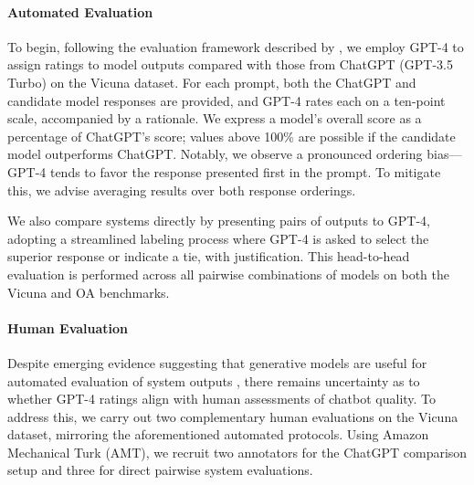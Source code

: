 \paragraph{Automated Evaluation} To begin, following the evaluation framework described by \citet{vicuna2023}, we employ GPT-4 to assign ratings to model outputs compared with those from ChatGPT (GPT-3.5 Turbo) on the Vicuna dataset. For each prompt, both the ChatGPT and candidate model responses are provided, and GPT-4 rates each on a ten-point scale, accompanied by a rationale. We express a model's overall score as a percentage of ChatGPT's score; values above 100\% are possible if the candidate model outperforms ChatGPT. Notably, we observe a pronounced ordering bias—GPT-4 tends to favor the response presented first in the prompt. To mitigate this, we advise averaging results over both response orderings.

We also compare systems directly by presenting pairs of outputs to GPT-4, adopting a streamlined labeling process where GPT-4 is asked to select the superior response or indicate a tie, with justification. This head-to-head evaluation is performed across all pairwise combinations of models on both the Vicuna and OA benchmarks.

\paragraph{Human Evaluation} Despite emerging evidence suggesting that generative models are useful for automated evaluation of system outputs \citep{fu2023gptscore}, there remains uncertainty as to whether GPT-4 ratings align with human assessments of chatbot quality. To address this, we carry out two complementary human evaluations on the Vicuna dataset, mirroring the aforementioned automated protocols. Using Amazon Mechanical Turk (AMT), we recruit two annotators for the ChatGPT comparison setup and three for direct pairwise system evaluations.

